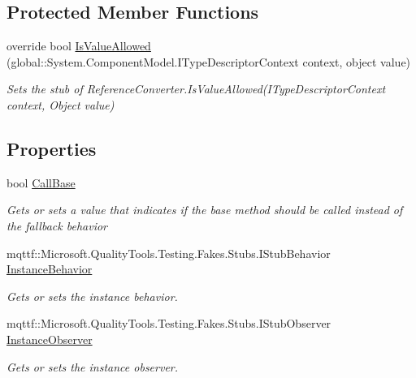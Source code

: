 \subsection*{Protected Member Functions}
\begin{DoxyCompactItemize}
\item 
override bool \hyperlink{class_system_1_1_component_model_1_1_fakes_1_1_stub_reference_converter_a561948cb194f8085dd7cc5d39d26572f}{Is\-Value\-Allowed} (global\-::\-System.\-Component\-Model.\-I\-Type\-Descriptor\-Context context, object value)
\begin{DoxyCompactList}\small\item\em Sets the stub of Reference\-Converter.\-Is\-Value\-Allowed(\-I\-Type\-Descriptor\-Context context, Object value)\end{DoxyCompactList}\end{DoxyCompactItemize}
\subsection*{Properties}
\begin{DoxyCompactItemize}
\item 
bool \hyperlink{class_system_1_1_component_model_1_1_fakes_1_1_stub_reference_converter_aad562ec3126e385d04dc6f7bee979710}{Call\-Base}
\begin{DoxyCompactList}\small\item\em Gets or sets a value that indicates if the base method should be called instead of the fallback behavior\end{DoxyCompactList}\item 
mqttf\-::\-Microsoft.\-Quality\-Tools.\-Testing.\-Fakes.\-Stubs.\-I\-Stub\-Behavior \hyperlink{class_system_1_1_component_model_1_1_fakes_1_1_stub_reference_converter_a92f24aba2edf3cd02a33cfc5752b2481}{Instance\-Behavior}
\begin{DoxyCompactList}\small\item\em Gets or sets the instance behavior.\end{DoxyCompactList}\item 
mqttf\-::\-Microsoft.\-Quality\-Tools.\-Testing.\-Fakes.\-Stubs.\-I\-Stub\-Observer \hyperlink{class_system_1_1_component_model_1_1_fakes_1_1_stub_reference_converter_ae086fb96a5174a661668fa25998ce510}{Instance\-Observer}
\begin{DoxyCompactList}\small\item\em Gets or sets the instance observer.\end{DoxyCompactList}\end{DoxyCompactItemize}


